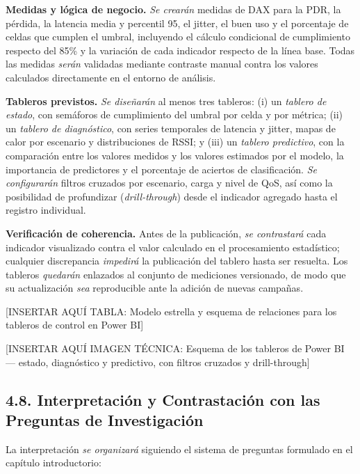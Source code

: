 \documentclass[
  12pt,
]{article}
\begin{document}
\textbf{Medidas y lógica de negocio.} \emph{Se crearán} medidas de DAX
para la PDR, la pérdida, la latencia media y percentil 95, el jitter, el
buen uso y el porcentaje de celdas que cumplen el umbral, incluyendo el
cálculo condicional de cumplimiento respecto del 85\% y la variación de
cada indicador respecto de la línea base. Todas las medidas \emph{serán}
validadas mediante contraste manual contra los valores calculados
directamente en el entorno de análisis.

\textbf{Tableros previstos.} \emph{Se diseñarán} al menos tres tableros:
(i) un \emph{tablero de estado}, con semáforos de cumplimiento del
umbral por celda y por métrica; (ii) un \emph{tablero de diagnóstico},
con series temporales de latencia y jitter, mapas de calor por escenario
y distribuciones de RSSI; y (iii) un \emph{tablero predictivo}, con la
comparación entre los valores medidos y los valores estimados por el
modelo, la importancia de predictores y el porcentaje de aciertos de
clasificación. \emph{Se configurarán} filtros cruzados por escenario,
carga y nivel de QoS, así como la posibilidad de profundizar
(\emph{drill-through}) desde el indicador agregado hasta el registro
individual.

\textbf{Verificación de coherencia.} Antes de la publicación, \emph{se
contrastará} cada indicador visualizado contra el valor calculado en el
procesamiento estadístico; cualquier discrepancia \emph{impedirá} la
publicación del tablero hasta ser resuelta. Los tableros \emph{quedarán}
enlazados al conjunto de mediciones versionado, de modo que su
actualización \emph{sea} reproducible ante la adición de nuevas
campañas.

{[}INSERTAR AQUÍ TABLA: Modelo estrella y esquema de relaciones para los
tableros de control en Power BI{]}

{[}INSERTAR AQUÍ IMAGEN TÉCNICA: Esquema de los tableros de Power BI —
estado, diagnóstico y predictivo, con filtros cruzados y
drill-through{]}

\subsection{4.8. Interpretación y Contrastación con las Preguntas de
Investigación}\label{interpretaciuxf3n-y-contrastaciuxf3n-con-las-preguntas-de-investigaciuxf3n}

La interpretación \emph{se organizará} siguiendo el sistema de preguntas
formulado en el capítulo introductorio:
\end{document}
